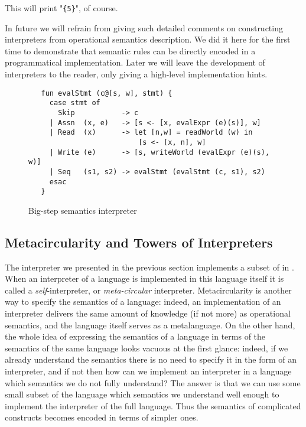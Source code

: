 This will print "\lstinline|{5}|", of course.

In future we will refrain from giving such detailed comments on constructing interpreters from operational semantics
description. We did it here for the first time to demonstrate that semantic rules can be directly encoded
in a programmatical implementation. Later we will leave the development of interpreters to the reader, only
giving a high-level implementation hints.

\begin{figure}[t]
  \begin{lstlisting}
   fun evalStmt (c@[s, w], stmt) {
     case stmt of
       Skip           -> c
     | Assn  (x, e)   -> [s <- [x, evalExpr (e)(s)], w]
     | Read  (x)      -> let [n,w] = readWorld (w) in
                          [s <- [x, n], w]
     | Write (e)      -> [s, writeWorld (evalExpr (e)(s), w)]
     | Seq   (s1, s2) -> evalStmt (evalStmt (c, s1), s2)    
     esac
   }
  \end{lstlisting}
  \caption{Big-step semantics interpreter}
  \label{bigint}
\end{figure}

\subsection{Metacircularity and Towers of Interpreters}

The interpreter we presented in the previous section implements a subset of \lama in \lama. When an interpreter of
a language is implemented in this language itself it is called a \emph{self}-interpreter, or \emph{meta-circular}
interpreter. Metacircularity is another way to specify the semantics of a language: indeed, an implementation
of an interpreter delivers the same amount of knowledge (if not more) as operational semantics, and the
language itself serves as a metalanguage. On the other hand, the whole idea of expressing the semantics of
a language in terms of the semantics of the same language looks vacuous at the first glance: indeed, if we
already understand the semantics there is no need to specify it in the form of an interpreter, and if not then how
can we implement an interpreter in a language which semantics we do not fully understand? The answer is that we can
use some small subset of the language which semantics we understand well enough to implement the interpreter of
the full language. Thus the semantics of complicated constructs becomes encoded in terms of simpler
ones. 

